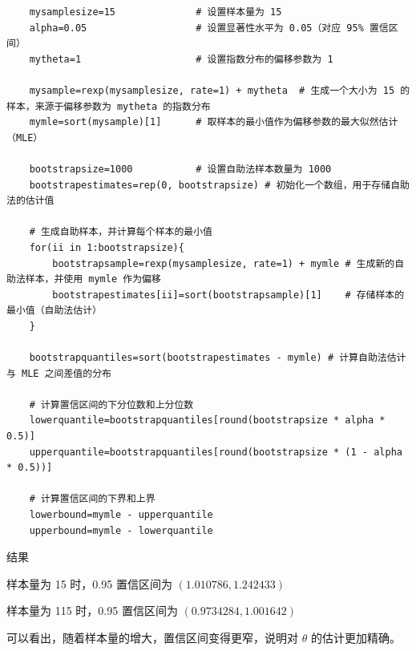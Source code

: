 \documentclass[UTF8]{report}
\theoremstyle{MyLineTheoremStyle} %
\theoremstyle{MyBlockTheoremStyle} %
\theoremstyle{MySubsubsectionStyle} %
\begin{document}
\begin{verbatim}
    mysamplesize=15              # 设置样本量为 15
    alpha=0.05                   # 设置显著性水平为 0.05（对应 95% 置信区间）
    mytheta=1                    # 设置指数分布的偏移参数为 1
    
    mysample=rexp(mysamplesize, rate=1) + mytheta  # 生成一个大小为 15 的样本，来源于偏移参数为 mytheta 的指数分布
    mymle=sort(mysample)[1]      # 取样本的最小值作为偏移参数的最大似然估计（MLE）
    
    bootstrapsize=1000           # 设置自助法样本数量为 1000
    bootstrapestimates=rep(0, bootstrapsize) # 初始化一个数组，用于存储自助法的估计值
    
    # 生成自助样本，并计算每个样本的最小值
    for(ii in 1:bootstrapsize){
        bootstrapsample=rexp(mysamplesize, rate=1) + mymle # 生成新的自助法样本，并使用 mymle 作为偏移
        bootstrapestimates[ii]=sort(bootstrapsample)[1]    # 存储样本的最小值（自助法估计）
    }
    
    bootstrapquantiles=sort(bootstrapestimates - mymle) # 计算自助法估计与 MLE 之间差值的分布
    
    # 计算置信区间的下分位数和上分位数
    lowerquantile=bootstrapquantiles[round(bootstrapsize * alpha * 0.5)]
    upperquantile=bootstrapquantiles[round(bootstrapsize * (1 - alpha * 0.5))]
    
    # 计算置信区间的下界和上界
    lowerbound=mymle - upperquantile
    upperbound=mymle - lowerquantile
    \end{verbatim}
    
    
    
    
    结果\par
    样本量为 15 时，0.95 置信区间为 $(1.010786, 1.242433)$\par
    样本量为 115 时，0.95 置信区间为 $(0.9734284, 1.001642)$\par
    可以看出，随着样本量的增大，置信区间变得更窄，说明对 $\theta$ 的估计更加精确。\par
\end{document}
